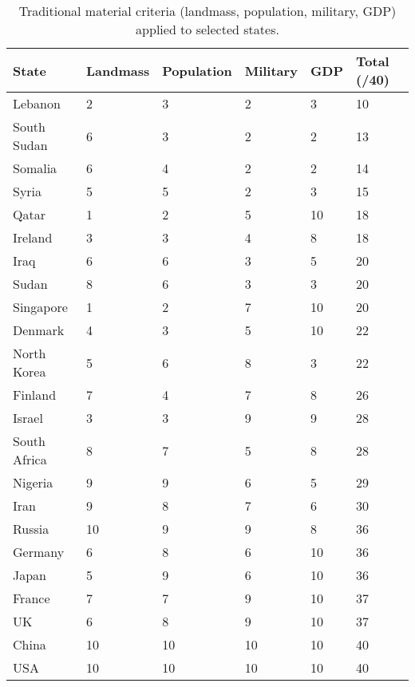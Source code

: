 \begin{table}[ht]
	\centering
	\begin{tabular}{p{2.8cm} p{1.8cm} p{1.8cm} p{1.8cm} p{1.8cm} p{1.8cm}}
		\hline
		\textbf{State} & \textbf{Landmass} & \textbf{Population} & \textbf{Military} & \textbf{GDP} & \textbf{Total (/40)} \\
		\hline
		Lebanon & 2 & 3 & 2 & 3 & 10 \\
		South Sudan & 6 & 3 & 2 & 2 & 13 \\
		Somalia & 6 & 4 & 2 & 2 & 14 \\
		Syria & 5 & 5 & 2 & 3 & 15 \\
		Qatar & 1 & 2 & 5 & 10 & 18 \\
		Ireland & 3 & 3 & 4 & 8 & 18 \\
		Iraq & 6 & 6 & 3 & 5 & 20 \\
		Sudan & 8 & 6 & 3 & 3 & 20 \\
		Singapore & 1 & 2 & 7 & 10 & 20 \\
		Denmark & 4 & 3 & 5 & 10 & 22 \\
		North Korea & 5 & 6 & 8 & 3 & 22 \\
		Finland & 7 & 4 & 7 & 8 & 26 \\
		Israel & 3 & 3 & 9 & 9 & 28 \\
		South Africa & 8 & 7 & 5 & 8 & 28 \\
		Nigeria & 9 & 9 & 6 & 5 & 29 \\
		Iran & 9 & 8 & 7 & 6 & 30 \\
		Russia & 10 & 9 & 9 & 8 & 36 \\
		Germany & 6 & 8 & 6 & 10 & 36 \\
		Japan & 5 & 9 & 6 & 10 & 36 \\
		France & 7 & 7 & 9 & 10 & 37 \\
		UK & 6 & 8 & 9 & 10 & 37 \\
		China & 10 & 10 & 10 & 10 & 40 \\
		USA & 10 & 10 & 10 & 10 & 40 \\
		\hline
	\end{tabular}
	\caption{Traditional material criteria (landmass, population, military, GDP) applied to selected states.}
\end{table}

\pgfplotsset{compat=1.18}

\pgfplotsset{compat=1.18}

